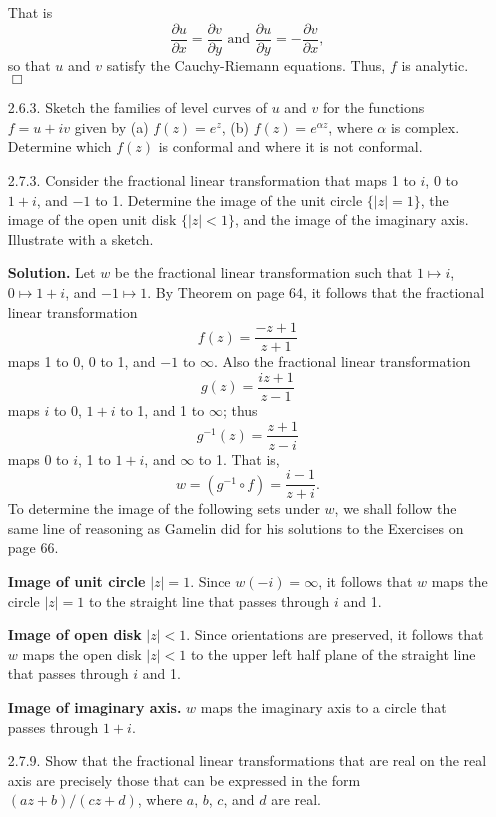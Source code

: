 \documentclass[9pt]{article}
\newcommand{\qed}{\hfill \ensuremath{\Box}}
\begin{document}
\begin{enumerate}
      That is
      $$\frac{\partial u}{\partial x} = \frac{\partial v}{\partial y}
        \text{ and }
        \frac{\partial u}{\partial y} = -\frac{\partial v}{\partial x},$$
      so that $u$ and $v$ satisfy the Cauchy-Riemann equations. Thus, $f$ is
      analytic. \qed
   \item[2.6.3.]  Sketch the families of level curves of $u$ and $v$ for the
                  functions $f = u + iv$ given by (a) $f(z) = e^z$, (b)
                  $f(z) = e^{\alpha z}$, where $\alpha$ is complex. Determine
                  which $f(z)$ is conformal and where it is not conformal.
   \item[2.7.3.]  Consider the fractional linear transformation that maps 1 to
                  $i$, 0 to $1 + i$, and $-1$ to 1. Determine the image of the
                  unit circle $\{|z| = 1\}$, the image of the open unit disk
                  $\{|z| < 1\}$, and the image of the imaginary axis. Illustrate
                  with a sketch.
                  
      \textbf{Solution.} Let $w$ be the fractional linear transformation such
      that $1 \mapsto i$, $0 \mapsto 1 + i$, and $-1 \mapsto 1$. By Theorem on
      page 64, it follows that the fractional linear transformation
      $$f(z) = \frac{-z + 1}{z+1}$$
      maps 1 to 0, 0 to 1, and $-1$ to $\infty$. Also the fractional linear
      transformation
      $$g(z) = \frac{iz + 1}{z-1}$$
      maps $i$ to 0, $1 + i$ to 1, and 1 to $\infty$; thus
      $$g^{-1}(z) = \frac{z + 1}{z-i}$$
      maps 0 to $i$, 1 to $1 + i$, and $\infty$ to 1. That is,
      $$w = (g^{-1} \circ f) = \frac{i-1}{z+i}.$$
      To determine the  image of the following sets under $w$, we shall follow
      the same line of reasoning as Gamelin did for his solutions to the Exercises on page 66.
      
      \textbf{Image of unit circle } $|z| = 1$. Since $w(-i) = \infty$, it
      follows that $w$ maps the circle $|z| = 1$ to the straight line that
      passes through $i$ and 1.
      
      \textbf{Image of open disk } $|z| < 1$. Since orientations are preserved,
      it follows that $w$ maps the open disk $|z| < 1$ to the upper left half
      plane of the  straight line that passes through $i$ and 1.
      
      \textbf{Image of imaginary axis.} $w$ maps the imaginary axis to a circle
      that passes through $1 + i$.
   \item[2.7.9.]  Show that the fractional linear transformations that are real
                  on the real axis are precisely those that can be expressed in
                  the form $(az+b)/(cz+d)$, where $a$, $b$, $c$, and $d$ are
                  real.
                  

\end{enumerate}
\end{document}
